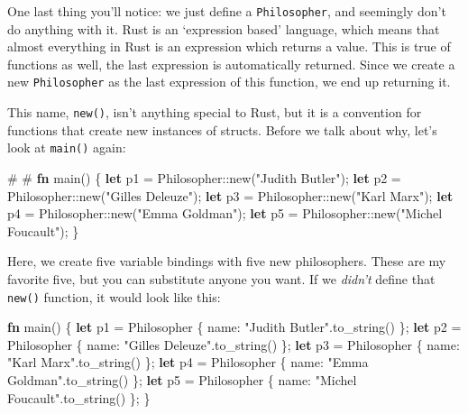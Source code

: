 \documentclass[a4paper,]{book}
\newenvironment{Shaded}{\begin{snugshade}}{\end{snugshade}}
\newcommand{\KeywordTok}[1]{\textcolor[rgb]{0.13,0.29,0.53}{\textbf{{#1}}}}
\newcommand{\StringTok}[1]{\textcolor[rgb]{0.31,0.60,0.02}{{#1}}}
\newcommand{\NormalTok}[1]{{#1}}
\begin{document}
One last thing you'll notice: we just define a \texttt{Philosopher}, and
seemingly don't do anything with it. Rust is an `expression based'
language, which means that almost everything in Rust is an expression
which returns a value. This is true of functions as well, the last
expression is automatically returned. Since we create a new
\texttt{Philosopher} as the last expression of this function, we end up
returning it.

This name, \texttt{new()}, isn't anything special to Rust, but it is a
convention for functions that create new instances of structs. Before we
talk about why, let's look at \texttt{main()} again:

\begin{Shaded}
\begin{Highlighting}[]
\NormalTok{#}
\NormalTok{#}
\KeywordTok{fn} \NormalTok{main() \{}
    \KeywordTok{let} \NormalTok{p1 = Philosopher::new(}\StringTok{"Judith Butler"}\NormalTok{);}
    \KeywordTok{let} \NormalTok{p2 = Philosopher::new(}\StringTok{"Gilles Deleuze"}\NormalTok{);}
    \KeywordTok{let} \NormalTok{p3 = Philosopher::new(}\StringTok{"Karl Marx"}\NormalTok{);}
    \KeywordTok{let} \NormalTok{p4 = Philosopher::new(}\StringTok{"Emma Goldman"}\NormalTok{);}
    \KeywordTok{let} \NormalTok{p5 = Philosopher::new(}\StringTok{"Michel Foucault"}\NormalTok{);}
\NormalTok{\}}
\end{Highlighting}
\end{Shaded}

Here, we create five variable bindings with five new philosophers. These
are my favorite five, but you can substitute anyone you want. If we
\emph{didn't} define that \texttt{new()} function, it would look like
this:

\begin{Shaded}
\begin{Highlighting}[]
\KeywordTok{fn} \NormalTok{main() \{}
    \KeywordTok{let} \NormalTok{p1 = Philosopher \{ name: }\StringTok{"Judith Butler"}\NormalTok{.to_string() \};}
    \KeywordTok{let} \NormalTok{p2 = Philosopher \{ name: }\StringTok{"Gilles Deleuze"}\NormalTok{.to_string() \};}
    \KeywordTok{let} \NormalTok{p3 = Philosopher \{ name: }\StringTok{"Karl Marx"}\NormalTok{.to_string() \};}
    \KeywordTok{let} \NormalTok{p4 = Philosopher \{ name: }\StringTok{"Emma Goldman"}\NormalTok{.to_string() \};}
    \KeywordTok{let} \NormalTok{p5 = Philosopher \{ name: }\StringTok{"Michel Foucault"}\NormalTok{.to_string() \};}
\NormalTok{\}}
\end{Highlighting}
\end{Shaded}
\end{document}
